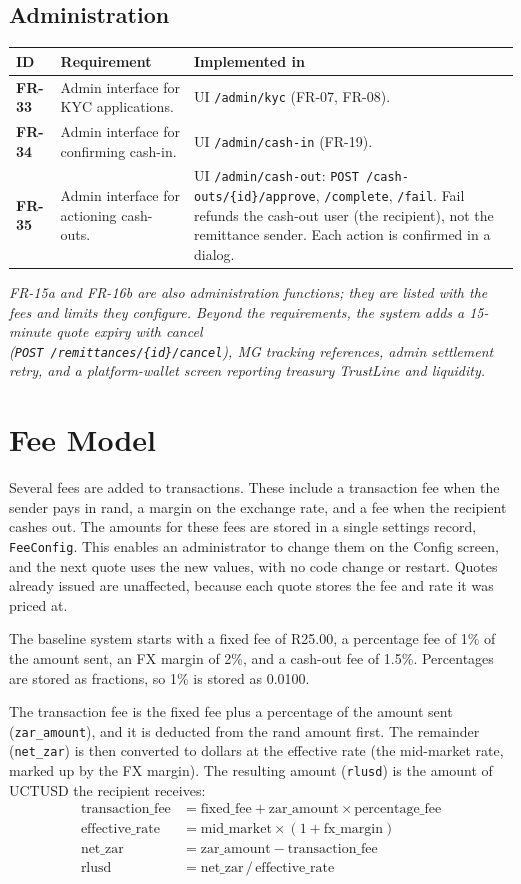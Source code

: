\documentclass[11pt,a4paper]{article}
\makeatletter
\newcommand{\code}[1]{\texttt{\small #1}}
\newenvironment{frtable}{%
  \rowcolors{2}{white}{rowbg}
  \begin{longtable}{@{}>{\bfseries}l >{\RaggedRight\arraybackslash}p{5.5cm} >{\RaggedRight\arraybackslash}p{8.4cm}@{}}
  \toprule
  \rowcolor{headbg}\textbf{ID} & \textbf{Requirement} & \textbf{Implemented in} \\
  \midrule
  \endhead
  \bottomrule
  \endlastfoot}
 {\end{longtable}}
\newcommand{\tablenote}[1]{{\small\color{ink}\itshape #1\par}}
\makeatother
\begin{document}
\subsection{Administration}
\begin{frtable}
FR-33 & Admin interface for KYC applications.
      & UI \code{/admin/kyc} (FR-07, FR-08). \\
FR-34 & Admin interface for confirming cash-in.
      & UI \code{/admin/cash-in} (FR-19). \\
FR-35 & Admin interface for actioning cash-outs.
      & UI \code{/admin/cash-out}: \code{POST /cash-outs/\{id\}/approve}, \code{/complete}, \code{/fail}. Fail refunds the cash-out user (the recipient), not the remittance sender. Each action is confirmed in a dialog. \\
\end{frtable}
\tablenote{FR-15a and FR-16b are also administration functions; they are listed with the fees and limits they configure. Beyond the requirements, the system adds a 15-minute quote expiry with cancel\\ (\code{POST /remittances/\{id\}/cancel}), MG tracking references, admin settlement retry, and a platform-wallet screen reporting treasury TrustLine and liquidity.}

\section{Fee Model}\label{sec:fees}

Several fees are added to transactions. These include a transaction fee when the sender pays in rand, a margin on the exchange rate, and a fee when the recipient cashes out. The amounts for these fees are stored in a single settings record, \code{FeeConfig}. This enables an administrator to change them on the Config screen, and the next quote uses the new values, with no code change or restart. Quotes already issued are unaffected, because each quote stores the fee and rate it was priced at.

The baseline system starts with a fixed fee of R25.00, a percentage fee of 1\% of the amount sent, an FX margin of 2\%, and a cash-out fee of 1.5\%. Percentages are stored as fractions, so 1\% is stored as 0.0100.

The transaction fee is the fixed fee plus a percentage of the amount sent (\code{zar\_amount}), and it is deducted from the rand amount first. The remainder (\code{net\_zar}) is then converted to dollars at the effective rate (the mid-market rate, marked up by the FX margin). The resulting amount (\code{rlusd}) is the amount of UCTUSD the recipient receives:
\begin{align*}
\text{transaction\_fee} &= \text{fixed\_fee} + \text{zar\_amount} \times \text{percentage\_fee}\\
\text{effective\_rate}  &= \text{mid\_market} \times (1 + \text{fx\_margin})\\
\text{net\_zar}         &= \text{zar\_amount} - \text{transaction\_fee}\\
\text{rlusd}            &= \text{net\_zar} \,/\, \text{effective\_rate}
\end{align*}
\end{document}

